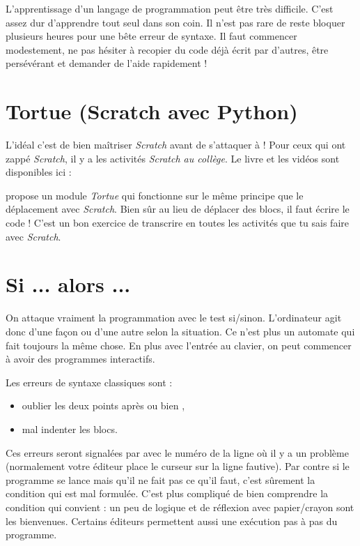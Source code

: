 \documentclass[11pt,class=report,crop=false]{standalone}
\begin{document}
L'apprentissage d'un langage de programmation peut être très difficile. C'est assez dur d'apprendre tout seul dans son coin. Il n'est pas rare de reste bloquer plusieurs heures pour une bête erreur de syntaxe. Il faut commencer modestement, ne pas hésiter à recopier du code déjà écrit par d'autres, être persévérant et demander de l'aide rapidement !


\section{Tortue (Scratch avec Python)}

L'idéal c'est de bien maîtriser \emph{Scratch} avant de s'attaquer à \Python{} !
Pour ceux qui ont zappé \emph{Scratch}, il y a les activités \emph{Scratch au collège}. Le livre et les vidéos sont disponibles ici :

\Python{} propose un module \emph{Tortue} qui fonctionne sur le même principe que le déplacement avec \emph{Scratch}.
Bien sûr au lieu de déplacer des blocs, il faut écrire le code !
C'est un bon exercice de transcrire en \Python{} toutes les activités que tu sais faire avec \emph{Scratch}.


\section{Si ... alors ...}

On attaque vraiment la programmation avec le test \og{}si/sinon\fg{}.
L'ordinateur agit donc d'une façon ou d'une autre selon la situation. Ce n'est plus un automate qui fait toujours la même chose. En plus avec l'entrée au clavier, on peut commencer à avoir des programmes interactifs.

Les erreurs de syntaxe classiques sont :
\begin{itemize}
  \item oublier les deux points après  ou bien ,
  \item mal indenter les blocs.
\end{itemize}
Ces erreurs seront signalées par \Python{} avec le numéro de la ligne où il y a un problème (normalement votre éditeur place le curseur sur la ligne fautive).
Par contre si le programme se lance mais qu'il ne fait pas ce qu'il faut, c'est sûrement la condition qui est mal formulée. C'est plus compliqué de bien comprendre la condition qui convient : un peu de logique et de réflexion avec papier/crayon sont les bienvenues. 
Certains éditeurs \Python{} permettent aussi une exécution \og{}pas à pas\fg{} du programme.
\end{document}
